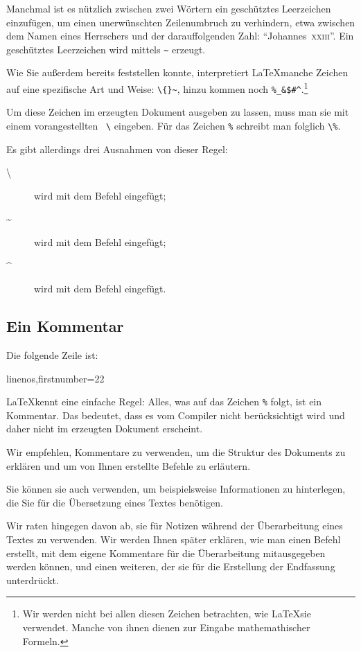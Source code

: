 Manchmal ist es nützlich zwischen zwei Wörtern ein geschütztes Leerzeichen einzufügen, um einen unerwünschten Zeilenumbruch zu verhindern, etwa zwischen dem Namen eines Herrschers und der darauffolgenden Zahl:  \enquote{Johannes~\textsc{xxiii}}. Ein geschütztes Leerzeichen wird mittels \verb|~| erzeugt.

Wie Sie außerdem bereits feststellen konnte, interpretiert \LaTeX manche Zeichen auf eine spezifische Art und Weise: \verb|\{}~|, hinzu kommen noch \verb|%_&$#^|.\footnote{Wir werden nicht bei allen diesen Zeichen betrachten, wie \LaTeX sie verwendet. Manche von ihnen dienen zur Eingabe mathemathischer Formeln.}

Um diese Zeichen im erzeugten Dokument ausgeben zu lassen, muss man sie mit einem vorangestellten ~\verb|\| eingeben. Für das Zeichen \verb|%| schreibt man folglich \verb|\%|.

Es gibt allerdings drei Ausnahmen von dieser Regel:
\begin{description}
\item[\textbackslash] wird mit dem Befehl  eingefügt;
\item[\textasciitilde] wird mit dem Befehl  eingefügt; 
\item[\textasciicircum] wird mit dem Befehl  eingefügt. 
\end{description}
 
\subsection{Ein Kommentar}

Die folgende Zeile ist: 
\begin{latexcode*}{linenos,firstnumber=22}
\end{latexcode*}

\LaTeX kennt eine einfache Regel: Alles, was auf das Zeichen \verb|%| folgt, ist ein Kommentar.
Das bedeutet, dass es vom Compiler nicht berücksichtigt wird und daher nicht im erzeugten Dokument erscheint. 

Wir empfehlen, Kommentare zu verwenden, um die Struktur des Dokuments zu erklären und um von Ihnen erstellte Befehle zu erläutern.

Sie können sie auch verwenden, um beispielsweise Informationen zu hinterlegen, die Sie für die Übersetzung eines Textes benötigen.

Wir raten hingegen davon ab, sie für Notizen während der Überarbeitung eines Textes zu verwenden. Wir werden Ihnen später erklären, wie man einen Befehl erstellt, mit dem eigene Kommentare für die Überarbeitung mitausgegeben werden können, und einen weiteren, der sie für die Erstellung der Endfassung unterdrückt.



